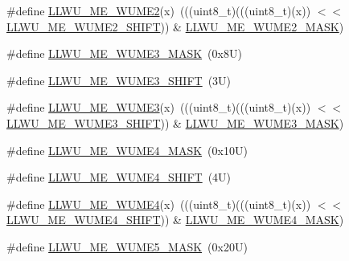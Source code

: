 \begin{DoxyCompactItemize}
\item 
\#define \mbox{\hyperlink{group___l_l_w_u___register___masks_gaad5f38620081713700faa574d4756037}{L\+L\+W\+U\+\_\+\+M\+E\+\_\+\+W\+U\+M\+E2}}(x)~(((uint8\+\_\+t)(((uint8\+\_\+t)(x)) $<$$<$ \mbox{\hyperlink{group___l_l_w_u___register___masks_ga383c567df0dbc9edf2773d29676a7b30}{L\+L\+W\+U\+\_\+\+M\+E\+\_\+\+W\+U\+M\+E2\+\_\+\+S\+H\+I\+FT}})) \& \mbox{\hyperlink{group___l_l_w_u___register___masks_ga9f19f501dd2ad4aa2f7b01ac8edf8056}{L\+L\+W\+U\+\_\+\+M\+E\+\_\+\+W\+U\+M\+E2\+\_\+\+M\+A\+SK}})
\item 
\#define \mbox{\hyperlink{group___l_l_w_u___register___masks_ga6f6ea286130568de4df073a50fbdc282}{L\+L\+W\+U\+\_\+\+M\+E\+\_\+\+W\+U\+M\+E3\+\_\+\+M\+A\+SK}}~(0x8\+U)
\item 
\#define \mbox{\hyperlink{group___l_l_w_u___register___masks_ga394f6049d44881fafbc58b62e3ea8f44}{L\+L\+W\+U\+\_\+\+M\+E\+\_\+\+W\+U\+M\+E3\+\_\+\+S\+H\+I\+FT}}~(3\+U)
\item 
\#define \mbox{\hyperlink{group___l_l_w_u___register___masks_gafd25630d6da4e8bd90c95a1b534bfe26}{L\+L\+W\+U\+\_\+\+M\+E\+\_\+\+W\+U\+M\+E3}}(x)~(((uint8\+\_\+t)(((uint8\+\_\+t)(x)) $<$$<$ \mbox{\hyperlink{group___l_l_w_u___register___masks_ga394f6049d44881fafbc58b62e3ea8f44}{L\+L\+W\+U\+\_\+\+M\+E\+\_\+\+W\+U\+M\+E3\+\_\+\+S\+H\+I\+FT}})) \& \mbox{\hyperlink{group___l_l_w_u___register___masks_ga6f6ea286130568de4df073a50fbdc282}{L\+L\+W\+U\+\_\+\+M\+E\+\_\+\+W\+U\+M\+E3\+\_\+\+M\+A\+SK}})
\item 
\#define \mbox{\hyperlink{group___l_l_w_u___register___masks_ga4b7fa4566d64069e93d5bf9bf69efcf4}{L\+L\+W\+U\+\_\+\+M\+E\+\_\+\+W\+U\+M\+E4\+\_\+\+M\+A\+SK}}~(0x10\+U)
\item 
\#define \mbox{\hyperlink{group___l_l_w_u___register___masks_gad162d87bd892f7bfcd34c74941168e64}{L\+L\+W\+U\+\_\+\+M\+E\+\_\+\+W\+U\+M\+E4\+\_\+\+S\+H\+I\+FT}}~(4\+U)
\item 
\#define \mbox{\hyperlink{group___l_l_w_u___register___masks_ga4f426ee3d4121039991f556746934a66}{L\+L\+W\+U\+\_\+\+M\+E\+\_\+\+W\+U\+M\+E4}}(x)~(((uint8\+\_\+t)(((uint8\+\_\+t)(x)) $<$$<$ \mbox{\hyperlink{group___l_l_w_u___register___masks_gad162d87bd892f7bfcd34c74941168e64}{L\+L\+W\+U\+\_\+\+M\+E\+\_\+\+W\+U\+M\+E4\+\_\+\+S\+H\+I\+FT}})) \& \mbox{\hyperlink{group___l_l_w_u___register___masks_ga4b7fa4566d64069e93d5bf9bf69efcf4}{L\+L\+W\+U\+\_\+\+M\+E\+\_\+\+W\+U\+M\+E4\+\_\+\+M\+A\+SK}})
\item 
\#define \mbox{\hyperlink{group___l_l_w_u___register___masks_gadeab309cd88e84e94433398ea4656511}{L\+L\+W\+U\+\_\+\+M\+E\+\_\+\+W\+U\+M\+E5\+\_\+\+M\+A\+SK}}~(0x20\+U)
$$
\end{DoxyCompactItemize}
